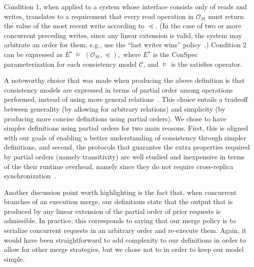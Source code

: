 \documentclass[journal,compsoc]{IEEEtran}
\begin{document}
Condition 1, when applied to a system whose interface consists only of reads and writes, translates to a requirement that every read operation in %
 ${\mathcal{O}_{St}}$ must return the value of the most recent write according to $\preccurlyeq$. (In the case of two or more concurrent preceding writes, since any linear extension is valid, the system may arbitrate an order for them, e.g., use the ``last writer wins'' policy~\cite{lww}.)
  Condition 2 can be expressed as $ E^s\; \vDash \; \left( {\mathcal{O}_{St}}, \preccurlyeq \right),$ where %
  $E^s$ is the ConSpec parameterization for each
 consistency model $\mathcal{C}$,
 and  $\vDash$ is the satisfies operator.
 \par A noteworthy choice that was made when producing the above definition is that consistency models are expressed in terms of  partial order among operations performed, instead of using more general relations~\cite{Burckhardt:2014:PEC:2693641.2693642}. This choice entails a tradeoff between generality (by allowing for arbitrary relations) and simplicity (by producing more concise definitions using partial orders). We chose to have simpler definitions using partial orders for two main reasons. First, this is aligned with our goals of enabling a better understanding of consistency through simpler definitions, and second, the protocols that guarantee the extra properties required by partial orders (namely transitivity) are well studied and inexpensive in terms of the their runtime overhead, namely since they do not require cross-replica synchronization~\cite{Bailis:2013:BCC:2463676.2465279,Lloyd:2011:DSE:2043556.2043593}.

Another discussion point worth highlighting is the fact that, when concurrent branches of an execution merge, our definitions state that the output that is produced by any linear extension of the partial order of prior requests is admissible. In practice, this corresponds to saying that our merge policy is to serialize concurrent requests in an arbitrary order and re-execute them. Again, it would have been straightforward to add complexity to our definitions in order to allow for other merge strategies, but we chose not to in order to keep our model simple.
\end{document}
